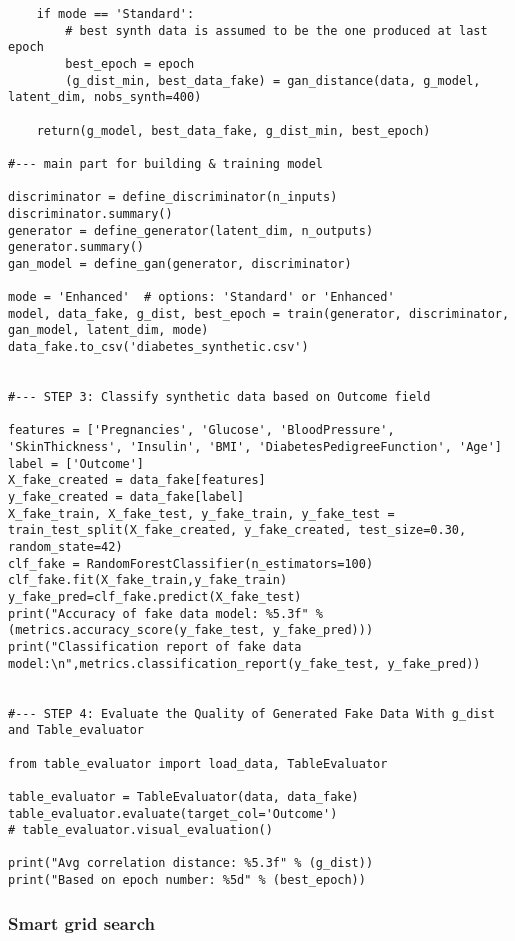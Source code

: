 \documentclass[oneside,10pt]{book}
\begin{document}
\begin{lstlisting}
    if mode == 'Standard':
        # best synth data is assumed to be the one produced at last epoch
        best_epoch = epoch
        (g_dist_min, best_data_fake) = gan_distance(data, g_model, latent_dim, nobs_synth=400)
       
    return(g_model, best_data_fake, g_dist_min, best_epoch) 

#--- main part for building & training model

discriminator = define_discriminator(n_inputs)
discriminator.summary()
generator = define_generator(latent_dim, n_outputs)
generator.summary()
gan_model = define_gan(generator, discriminator)

mode = 'Enhanced'  # options: 'Standard' or 'Enhanced'
model, data_fake, g_dist, best_epoch = train(generator, discriminator, gan_model, latent_dim, mode)
data_fake.to_csv('diabetes_synthetic.csv') 
    

#--- STEP 3: Classify synthetic data based on Outcome field

features = ['Pregnancies', 'Glucose', 'BloodPressure', 'SkinThickness', 'Insulin', 'BMI', 'DiabetesPedigreeFunction', 'Age']
label = ['Outcome']
X_fake_created = data_fake[features]
y_fake_created = data_fake[label]
X_fake_train, X_fake_test, y_fake_train, y_fake_test = train_test_split(X_fake_created, y_fake_created, test_size=0.30, random_state=42)
clf_fake = RandomForestClassifier(n_estimators=100)
clf_fake.fit(X_fake_train,y_fake_train)
y_fake_pred=clf_fake.predict(X_fake_test)
print("Accuracy of fake data model: %5.3f" % (metrics.accuracy_score(y_fake_test, y_fake_pred)))
print("Classification report of fake data model:\n",metrics.classification_report(y_fake_test, y_fake_pred))


#--- STEP 4: Evaluate the Quality of Generated Fake Data With g_dist and Table_evaluator

from table_evaluator import load_data, TableEvaluator

table_evaluator = TableEvaluator(data, data_fake)
table_evaluator.evaluate(target_col='Outcome')
# table_evaluator.visual_evaluation() 

print("Avg correlation distance: %5.3f" % (g_dist))
print("Based on epoch number: %5d" % (best_epoch))
\end{lstlisting}

\subsubsection{Smart grid search}
\end{document}
